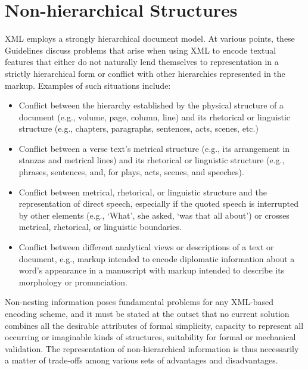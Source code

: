 
\section[{Non-hierarchical Structures}]{Non-hierarchical Structures}\label{NH}\par
XML employs a strongly hierarchical document model. At various points, these Guidelines discuss problems that arise when using XML to encode textual features that either do not naturally lend themselves to representation in a strictly hierarchical form or conflict with other hierarchies represented in the markup. Examples of such situations include: \begin{itemize}
\item \par
Conflict between the hierarchy established by the physical structure of a document (e.g., volume, page, column, line) and its rhetorical or linguistic structure (e.g., chapters, paragraphs, sentences, acts, scenes, etc.)
\item \par
Conflict between a verse text's metrical structure (e.g., its arrangement in stanzas and metrical lines) and its rhetorical or linguistic structure (e.g., phrases, sentences, and, for plays, acts, scenes, and speeches).
\item \par
Conflict between metrical, rhetorical, or linguistic structure and the representation of direct speech, especially if the quoted speech is interrupted by other elements (e.g., ‘What’, she asked, ‘was that all about’) or crosses metrical, rhetorical, or linguistic boundaries.
\item \par
Conflict between different analytical views or descriptions of a text or document, e.g., markup intended to encode diplomatic information about a word's appearance in a manuscript with markup intended to describe its morphology or pronunciation.
\end{itemize} \par
Non-nesting information poses fundamental problems for any XML-based encoding scheme, and it must be stated at the outset that no current solution combines all the desirable attributes of formal simplicity, capacity to represent all occurring or imaginable kinds of structures, suitability for formal or mechanical validation. The representation of non-hierarchical information is thus necessarily a matter of trade-offs among various sets of advantages and disadvantages.\par
